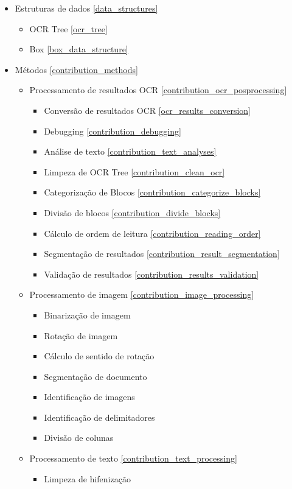 \begin{itemize}\setlength\itemsep{-0.3em}
	\item Estruturas de dados \ref{data_structures}
	\begin{itemize}\setlength\itemsep{-0.3em}
		\item OCR Tree \ref{ocr_tree}
		\item Box \ref{box_data_structure}
	\end{itemize}
	\item Métodos \ref{contribution_methods}
	
	\begin{itemize}\setlength\itemsep{-0.3em}
		\item Processamento de resultados OCR \ref{contribution_ocr_posprocessing}
		
		\begin{itemize}\setlength\itemsep{-0.3em}
			\item Conversão de resultados OCR \ref{ocr_results_conversion}
			\item Debugging \ref{contribution_debugging}
			\item Análise de texto \ref{contribution_text_analyses}
			\item Limpeza de OCR Tree \ref{contribution_clean_ocr}
			\item Categorização de Blocos \ref{contribution_categorize_blocks}
			\item Divisão de blocos \ref{contribution_divide_blocks}
			\item Cálculo de ordem de leitura \ref{contribution_reading_order}
			\item Segmentação de resultados \ref{contribution_result_segmentation}
			\item Validação de resultados \ref{contribution_results_validation}
		\end{itemize}
		
		\item Processamento de imagem \ref{contribution_image_processing}
		\begin{itemize}\setlength\itemsep{-0.3em}
			\item Binarização de imagem
			\item Rotação de imagem
			\item Cálculo de sentido de rotação
			\item Segmentação de documento
			\item Identificação de imagens
			\item Identificação de delimitadores
			\item Divisão de colunas 
		\end{itemize}
		
		\item Processamento de texto \ref{contribution_text_processing}
		\begin{itemize}\setlength\itemsep{-0.3em}
			\item Limpeza de hifenização
		\end{itemize}
		
		
	\end{itemize}
\end{itemize}


